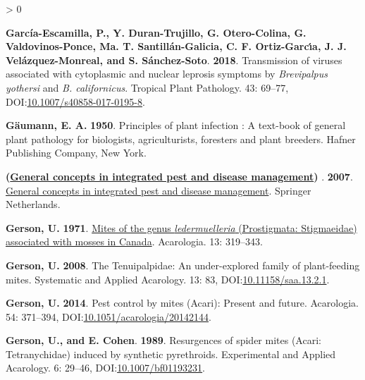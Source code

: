 \documentclass{ufdissertation}[overrideChapters] %
\newlength{\cslhangindent}
\newenvironment{CSLReferences}[2] %
 {%
  \setlength{\parindent}{0pt}
  \ifodd #1 \everypar{\setlength{\hangindent}{\cslhangindent}}\ignorespaces\fi
  \ifnum #2 > 0
  \setlength{\parskip}{#2\baselineskip}
  \fi
 }%
 {}
\begin{document}
{\begin{CSLReferences}{1}{1}
\leavevmode{}%
\textbf{García-Escamilla, P., Y. Duran-Trujillo, G. Otero-Colina, G. Valdovinos-Ponce, Ma. T. Santillán-Galicia, C. F. Ortiz-Garcı́a, J. J. Velázquez-Monreal, and S. Sánchez-Soto}. \textbf{2018}. Transmission of viruses associated with cytoplasmic and nuclear leprosis symptoms by {\emph{Brevipalpus yothersi}} and {\emph{B. californicus}}. Tropical Plant Pathology. 43: 69--77, DOI:\href{https://doi.org/10.1007/s40858-017-0195-8}{10.1007/s40858-017-0195-8}.

\leavevmode{}%
\textbf{Gäumann, E. A.} \textbf{1950}. Principles of plant infection : A text-book of general plant pathology for biologists, agriculturists, foresters and plant breeders. Hafner Publishing Company, New York.

\leavevmode{}%
\textbf{(\href{https://www.ebook.de/de/product/6740472/general_concepts_in_integrated_pest_and_disease_management.html}{General concepts in integrated pest and disease management}) }. \textbf{2007}. \href{https://www.ebook.de/de/product/6740472/general_concepts_in_integrated_pest_and_disease_management.html}{General concepts in integrated pest and disease management}. Springer Netherlands.

\leavevmode{}%
\textbf{Gerson, U.} \textbf{1971}. \href{http://www1.montpellier.inra.fr/CBGP/acarologia/article.php?id=3368}{Mites of the genus \emph{ledermuelleria} ({Prostigmata}: {Stigmaeidae}) associated with mosses in {Canada}}. Acarologia. 13: 319--343.

\leavevmode{}%
\textbf{Gerson, U.} \textbf{2008}. The {Tenuipalpidae}: An under-explored family of plant-feeding mites. Systematic and Applied Acarology. 13: 83, DOI:\href{https://doi.org/10.11158/saa.13.2.1}{10.11158/saa.13.2.1}.

\leavevmode{}%
\textbf{Gerson, U.} \textbf{2014}. Pest control by mites ({Acari}): Present and future. Acarologia. 54: 371--394, DOI:\href{https://doi.org/10.1051/acarologia/20142144}{10.1051/acarologia/20142144}.

\leavevmode{}%
\textbf{Gerson, U., and E. Cohen}. \textbf{1989}. Resurgences of spider mites ({Acari}: {Tetranychidae}) induced by synthetic pyrethroids. Experimental and Applied Acarology. 6: 29--46, DOI:\href{https://doi.org/10.1007/bf01193231}{10.1007/bf01193231}.


\end{CSLReferences}}
\end{document}
